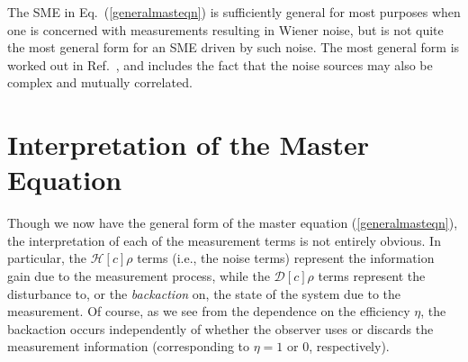 \documentclass[12pt,aps,onecolum,superscriptaddress,footinbib,floatfix,showpacs]{revtex4-1}
\begin{document}
The SME in Eq.~(\ref{generalmasteqn}) is sufficiently 
general for most purposes when one is concerned with measurements 
resulting in Wiener noise, but is not quite the most general form 
for an SME driven by such noise. The most general form 
is worked out in Ref.~\cite{Wiseman01}, and includes the fact 
that the noise sources may also be complex and mutually correlated.  


\section{Interpretation of the Master Equation}
\label{section:interpretation}

Though we now have the general form of the master equation (\ref{generalmasteqn}),
the interpretation of each of the measurement terms is not entirely obvious.
In particular, the 
$\mathcal{H}[c]\rho$ terms (i.e., the noise terms) represent the 
information gain due to the measurement process, while the
$\mathcal{D}[c]\rho$ terms represent the disturbance to, or 
the \textit{backaction} on,
the state of the system
due to the measurement.  Of course, as we see from the 
dependence on the efficiency $\eta$, the backaction occurs
independently of whether the observer uses or discards the
measurement information (corresponding to $\eta=1$ or $0$, respectively).
\end{document}
